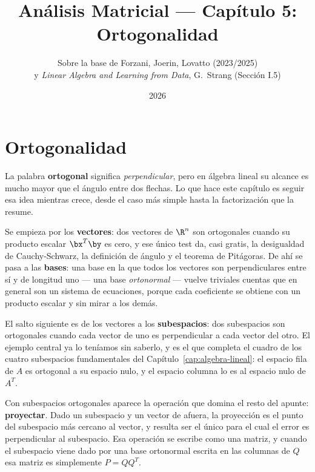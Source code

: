 

\theoremstyle{plain}
\newtheorem{teorema}[theorem]{Teorema}
\newtheorem{proposicion}[theorem]{Proposición}
\newtheorem{corolario}[theorem]{Corolario}
\theoremstyle{definition}
\newtheorem{definicion}[theorem]{Definición}
\newtheorem{ejemplo}[theorem]{Ejemplo}
\theoremstyle{remark}
\newtheorem{observacion}[theorem]{Observación}

\title{Análisis Matricial --- Capítulo 5: Ortogonalidad}
\author{Sobre la base de Forzani, Joerin, Lovatto (2023/2025)\\
y \emph{Linear Algebra and Learning from Data}, G.\ Strang (Sección I.5)}
\date{2026}
 

 
\chapter{Ortogonalidad}\label{cap:ortogonalidad}

La palabra \textbf{ortogonal} significa \emph{perpendicular}, pero en álgebra
lineal su alcance es mucho mayor que el ángulo entre dos flechas. Lo que hace
este capítulo es seguir esa idea mientras crece, desde el caso más simple
hasta la factorización que la resume.

Se empieza por los \textbf{vectores}: dos vectores de $\R^n$ son ortogonales
cuando su producto escalar $\bx^T\by$ es cero, y ese único test da, casi
gratis, la desigualdad de Cauchy-Schwarz, la definición de ángulo y el teorema
de Pitágoras. De ahí se pasa a las \textbf{bases}: una base en la que todos los
vectores son perpendiculares entre sí y de longitud uno --- una base
\emph{ortonormal} --- vuelve triviales cuentas que en general son un sistema de
ecuaciones, porque cada coeficiente se obtiene con un producto escalar y sin
mirar a los demás.

El salto siguiente es de los vectores a los \textbf{subespacios}: dos
subespacios son ortogonales cuando cada vector de uno es perpendicular a cada
vector del otro. El ejemplo central ya lo teníamos sin saberlo, y es el que
completa el cuadro de los cuatro subespacios fundamentales del
Capítulo~\ref{cap:algebra-lineal}: el espacio fila de $A$ es ortogonal a su
espacio nulo, y el espacio columna lo es al espacio nulo de $A^T$.

Con subespacios ortogonales aparece la operación que domina el resto del
apunte: \textbf{proyectar}. Dado un subespacio y un vector de afuera, la
proyección es el punto del subespacio más cercano al vector, y resulta ser el
único para el cual el error es perpendicular al subespacio. Esa operación se
escribe como una matriz, y cuando el subespacio viene dado por una base
ortonormal escrita en las columnas de $Q$ esa matriz es simplemente $P=QQ^T$.

